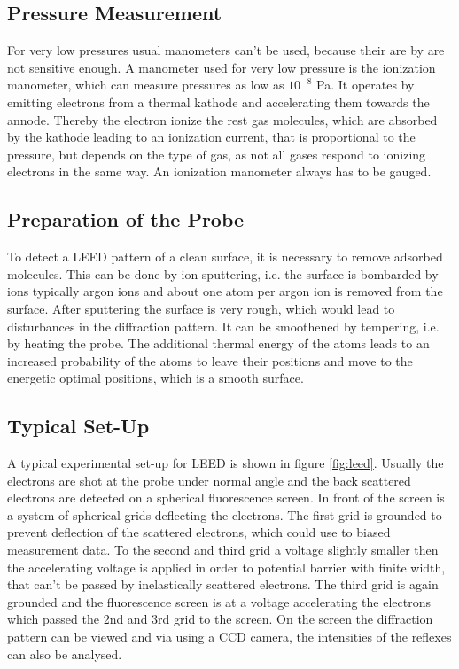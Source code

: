 \documentclass[a4paper]{scrartcl}
\numberwithin{equation}{section}
\numberwithin{figure}{section}
\numberwithin{table}{section}
\begin{document}
\subsection{Pressure Measurement}
For very low pressures usual manometers can't be used, because their are by are not sensitive enough. A manometer used for very low pressure is the ionization manometer, which can measure pressures as low as $10^{-8}$ Pa. It operates by emitting electrons from a thermal kathode and accelerating them towards the annode. Thereby the electron ionize the rest gas molecules, which are absorbed by the kathode leading to an ionization current, that is proportional to the pressure, but depends on the type of gas, as not all gases respond to ionizing electrons in the same way. An ionization manometer always has to be gauged.

\subsection{Preparation of the Probe}
To detect a LEED pattern of a clean surface, it is necessary to remove adsorbed molecules. This can be done by ion sputtering, i.e. the surface is bombarded by ions typically argon ions and about one atom per argon ion is removed from the surface. After sputtering the surface is very rough, which would lead to disturbances in the diffraction pattern. It can be smoothened by tempering, i.e. by heating the probe. The additional thermal energy of the atoms leads to an increased probability of the atoms to leave their positions and move to the energetic optimal positions, which is a smooth surface.

\subsection{Typical Set-Up}
A typical experimental set-up for LEED is shown in figure \ref{fig:leed}. Usually the electrons are shot at the probe under normal angle and the back scattered electrons are detected on a spherical fluorescence screen. In front of the screen is a system of spherical grids deflecting the electrons. The first grid is grounded to prevent deflection of the scattered electrons, which could use to biased measurement data. To the second and third grid a voltage slightly smaller then the accelerating voltage is applied in order to potential barrier with finite width, that can't be passed by inelastically scattered electrons. The third grid is again grounded and the fluorescence screen is at a voltage accelerating the electrons which passed the 2nd and 3rd grid to the screen. On the screen the diffraction pattern can be viewed and via using a CCD camera, the intensities of the reflexes can also be analysed.
\end{document}
